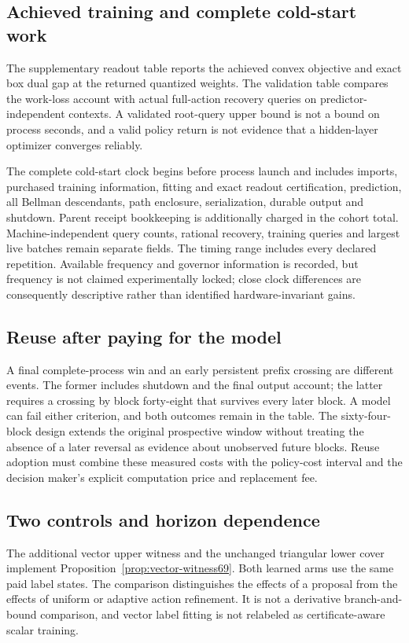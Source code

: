 \subsection{Achieved training and complete cold-start work}
The supplementary readout table reports the achieved convex objective and exact box dual gap at the returned quantized weights. The validation table compares the work-loss account with actual full-action recovery queries on predictor-independent contexts. A validated root-query upper bound is not a bound on process seconds, and a valid policy return is not evidence that a hidden-layer optimizer converges reliably.



The complete cold-start clock begins before process launch and includes imports, purchased training information, fitting and exact readout certification, prediction, all Bellman descendants, path enclosure, serialization, durable output and shutdown. Parent receipt bookkeeping is additionally charged in the cohort total. Machine-independent query counts, rational recovery, training queries and largest live batches remain separate fields. The timing range includes every declared repetition. Available frequency and governor information is recorded, but frequency is not claimed experimentally locked; close clock differences are consequently descriptive rather than identified hardware-invariant gains.

\subsection{Reuse after paying for the model}

A final complete-process win and an early persistent prefix crossing are different events. The former includes shutdown and the final output account; the latter requires a crossing by block forty-eight that survives every later block. A model can fail either criterion, and both outcomes remain in the table. The sixty-four-block design extends the original prospective window without treating the absence of a later reversal as evidence about unobserved future blocks. Reuse adoption must combine these measured costs with the policy-cost interval and the decision maker's explicit computation price and replacement fee.

\subsection{Two controls and horizon dependence}

The additional vector upper witness and the unchanged triangular lower cover implement Proposition~\ref{prop:vector-witness69}. Both learned arms use the same paid label states. The comparison distinguishes the effects of a proposal from the effects of uniform or adaptive action refinement. It is not a derivative branch-and-bound comparison, and vector label fitting is not relabeled as certificate-aware scalar training.

